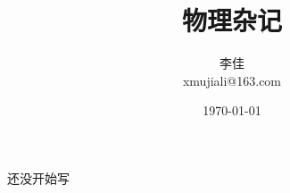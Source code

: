 \documentclass{ctexrep}[12pt,a4paper,openany]
\begin{document}
\title{\Huge 物理杂记}
\author{李佳\\xmujiali@163.com}
\date{\today}
\maketitle
\tableofcontents


还没开始写


%
%
%
\end{document}
